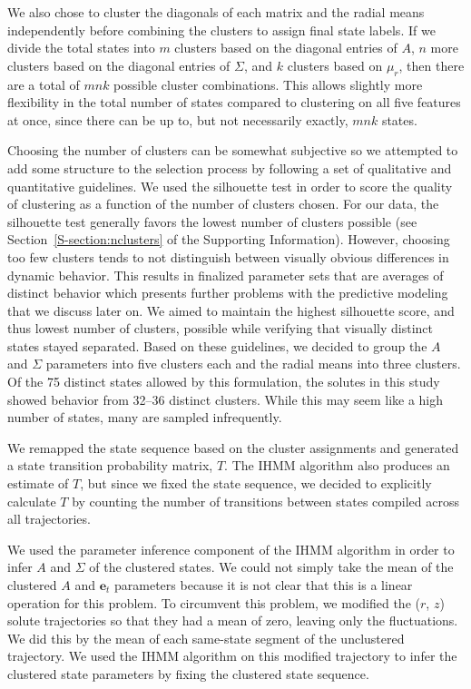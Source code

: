 \documentclass{article}
\begin{document}
  We also chose to cluster the diagonals of each matrix and the radial means
  independently before combining the clusters to assign final state labels. If we divide
  the total states into $m$ clusters based on the diagonal entries of $A$, $n$ more clusters 
  based on the diagonal entries of $\Sigma$, and $k$ clusters based on $\mu_r$, then there
  are a total of $mnk$ possible cluster combinations. This allows slightly more flexibility
  in the total number of states compared to clustering on all five features at once, since 
  there can be up to, but not necessarily exactly, $mnk$ states. 
  
  Choosing the number of clusters can be somewhat subjective so
  we attempted to add some structure to the selection process by following
  a set of qualitative and quantitative guidelines. We used the silhouette 
  test in order to score the quality of clustering as a function of the number 
  of clusters chosen. For our data, the silhouette test generally favors the 
  lowest number of clusters possible (see Section~\ref{S-section:nclusters} of
  the Supporting Information). However, choosing too few clusters tends to 
  not distinguish between visually obvious differences in 
  dynamic behavior. This results in finalized parameter sets that are averages of
  distinct behavior which presents further problems with the predictive modeling
  that we discuss later on. We aimed to maintain the highest silhouette score,
  and thus lowest number of clusters, possible while verifying that visually 
  distinct states stayed separated. Based on these guidelines, we decided to 
  group the $A$ and $\Sigma$ parameters into five clusters each and the radial
  means into three clusters. Of the 75 distinct states allowed by this formulation,
  the solutes in this study showed behavior from 32--36 distinct clusters. While
  this may seem like a high number of states, many are sampled infrequently.

  We remapped the state sequence based on the cluster assignments and generated a
  state transition probability matrix, $T$. The IHMM algorithm also produces an estimate
  of $T$, but since we fixed the state sequence, we decided to explicitly calculate $T$ 
  by counting the number of transitions between states compiled across all trajectories.

  We used the parameter inference component of the IHMM algorithm in order to 
  infer $A$ and $\Sigma$ of the clustered states.
  We could not simply take the mean of the clustered $A$ and $\mathbf{e}_t$ 
  parameters because it is not clear that this is a linear 
  operation for this problem. To circumvent this problem, we modified the ($r$,
  $z$) solute trajectories so that they had a mean of zero, leaving only the 
  fluctuations. We did this by the mean of each same-state segment of the 
  unclustered trajectory. We used the IHMM algorithm on this modified trajectory
  to infer the clustered state parameters by fixing the clustered state sequence. 
  
\end{document}
